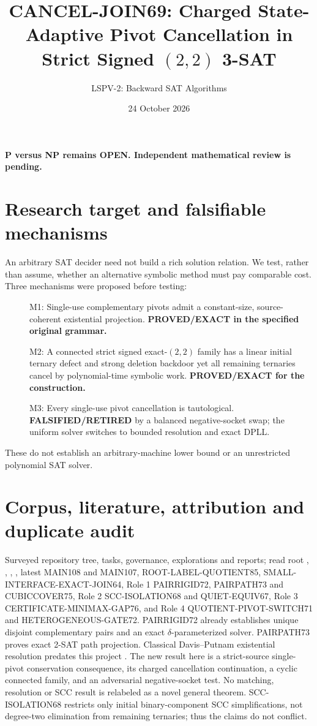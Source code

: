 \documentclass[11pt]{article}
\title{CANCEL-JOIN69: Charged State-Adaptive Pivot Cancellation in Strict Signed $(2,2)$ 3-SAT}
\author{LSPV-2: Backward SAT Algorithms}
\date{24 October 2026}
\begin{document}
\maketitle
\begin{center}
\textbf{P versus NP remains OPEN. Independent mathematical review is pending.}
\end{center}

\section{Research target and falsifiable mechanisms}
An arbitrary SAT decider need not build a rich solution relation. We test, rather than assume, whether an alternative symbolic method must pay comparable cost. Three mechanisms were proposed before testing:
\begin{description}
\item[] M1: Single-use complementary pivots admit a constant-size, source-coherent existential projection. \textbf{PROVED/EXACT in the specified original grammar.}
\item[] M2: A connected strict signed exact-$(2,2)$ family has a linear initial ternary defect and strong deletion backdoor yet all remaining ternaries cancel by polynomial-time symbolic work. \textbf{PROVED/EXACT for the construction.}
\item[] M3: Every single-use pivot cancellation is tautological. \textbf{FALSIFIED/RETIRED} by a balanced negative-socket swap; the uniform solver switches to bounded resolution and exact DPLL.
\end{description}
These do not establish an arbitrary-machine lower bound or an unrestricted polynomial SAT solver.

\section{Corpus, literature, attribution and duplicate audit}
Surveyed repository tree, tasks, governance, explorations and reports; read root , , , , latest MAIN108 and MAIN107, ROOT-LABEL-QUOTIENT85, SMALL-INTERFACE-EXACT-JOIN64, Role 1 PAIRRIGID72, PAIRPATH73 and CUBICCOVER75, Role 2 SCC-ISOLATION68 and QUIET-EQUIV67, Role 3 CERTIFICATE-MINIMAX-GAP76, and Role 4 QUOTIENT-PIVOT-SWITCH71 and HETEROGENEOUS-GATE72.
PAIRRIGID72 already establishes unique disjoint complementary pairs and an exact $\delta$-parameterized solver. PAIRPATH73 proves exact 2-SAT path projection. Classical Davis--Putnam existential resolution predates this project \cite{dp}. The new result here is a strict-source single-pivot conservation consequence, its charged cancellation continuation, a cyclic connected family, and an adversarial negative-socket test. No matching, resolution or SCC result is relabeled as a novel general theorem. SCC-ISOLATION68 restricts only initial binary-component SCC simplifications, not degree-two elimination from remaining ternaries; thus the claims do not conflict.
\end{document}
